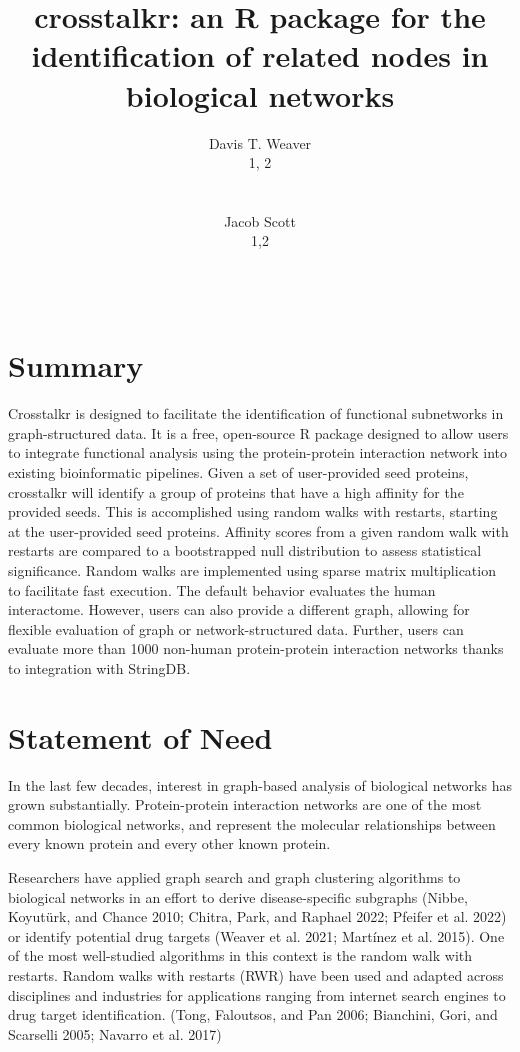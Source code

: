 \documentclass{article}
\title{crosstalkr: an R package for the identification of related nodes
in biological networks}
\author{
    Davis T. Weaver
   \\
    1, 2 \\
   \\
  \texttt{} \\
   \And
    Jacob Scott
   \\
    1,2 \\
   \\
  \texttt{} \\
  }
\begin{document}
\maketitle


\begin{abstract}

\end{abstract}


\hypertarget{summary}{%
\section{Summary}\label{summary}}

Crosstalkr is designed to facilitate the identification of functional
subnetworks in graph-structured data. It is a free, open-source R
package designed to allow users to integrate functional analysis using
the protein-protein interaction network into existing bioinformatic
pipelines. Given a set of user-provided seed proteins, crosstalkr will
identify a group of proteins that have a high affinity for the provided
seeds. This is accomplished using random walks with restarts, starting
at the user-provided seed proteins. Affinity scores from a given random
walk with restarts are compared to a bootstrapped null distribution to
assess statistical significance. Random walks are implemented using
sparse matrix multiplication to facilitate fast execution. The default
behavior evaluates the human interactome. However, users can also
provide a different graph, allowing for flexible evaluation of graph or
network-structured data. Further, users can evaluate more than 1000
non-human protein-protein interaction networks thanks to integration
with StringDB.

\hypertarget{statement-of-need}{%
\section{Statement of Need}\label{statement-of-need}}

In the last few decades, interest in graph-based analysis of biological
networks has grown substantially. Protein-protein interaction networks
are one of the most common biological networks, and represent the
molecular relationships between every known protein and every other
known protein.

Researchers have applied graph search and graph clustering algorithms to
biological networks in an effort to derive disease-specific subgraphs
(Nibbe, Koyutürk, and Chance 2010; Chitra, Park, and Raphael 2022;
Pfeifer et al. 2022) or identify potential drug targets (Weaver et al.
2021; Martínez et al. 2015). One of the most well-studied algorithms in
this context is the random walk with restarts. Random walks with
restarts (RWR) have been used and adapted across disciplines and
industries for applications ranging from internet search engines to drug
target identification. (Tong, Faloutsos, and Pan 2006; Bianchini, Gori,
and Scarselli 2005; Navarro et al. 2017)
\end{document}
